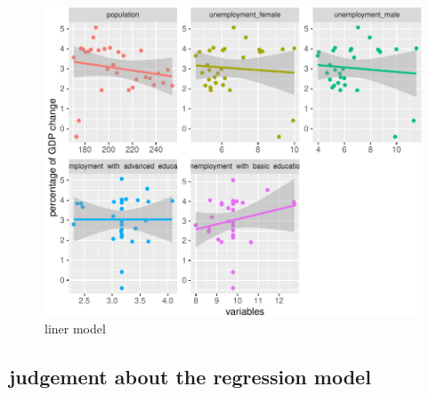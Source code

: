 \documentclass[11pt,a4paper,]{article}
\begin{document}
\begin{figure}[H]

{\centering \includegraphics{Figures/lin-1} 

}

\caption{liner model}\label{fig:lin}
\end{figure}

\subsection{judgement about the regression model}

\providecommand{\docline}[3]{\noalign{\global\setlength{\arrayrulewidth}{#1}}\arrayrulecolor[HTML]{#2}\cline{#3}}

\setlength{\tabcolsep}{2pt}

\renewcommand*{\arraystretch}{1.5}
\end{document}
